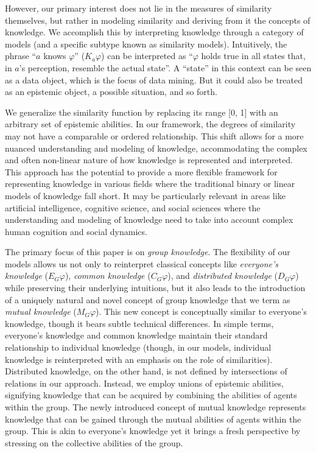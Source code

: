 \documentclass{article}
\renewcommand{\phi}{\varphi}
\begin{document}
However, our primary interest does not lie in the measures of similarity themselves, but rather in modeling similarity and deriving from it the concepts of knowledge. We accomplish this by interpreting knowledge through a category of models (and a specific subtype known as similarity models). Intuitively, the phrase ``$a$ knows $\phi$'' ($K_a\phi$) can be interpreted as ``$\phi$ holds true in all states that, in $a$'s perception, resemble the actual state''. A ``state'' in this context can be seen as a data object, which is the focus of data mining. But it could also be treated as an epistemic object, a possible situation, and so forth.

We generalize the similarity function by replacing its range [0, 1] with an arbitrary set of epistemic abilities. In our framework, the degrees of similarity may not have a comparable or ordered relationship. This shift allows for a more nuanced understanding and modeling of knowledge, accommodating the complex and often non-linear nature of how knowledge is represented and interpreted. This approach has the potential to provide a more flexible framework for representing knowledge in various fields where the traditional binary or linear models of knowledge fall short. It may be particularly relevant in areas like artificial intelligence, cognitive science, and social sciences where the understanding and modeling of knowledge need to take into account complex human cognition and social dynamics.

The primary focus of this paper is on \emph{group knowledge}. The flexibility of our models allows us not only to reinterpret classical concepts like \emph{everyone's knowledge} ($E_G\phi$), \emph{common knowledge} ($C_G\phi$), and \emph{distributed knowledge} ($D_G\phi$) while preserving their underlying intuitions, but it also leads to the introduction of a uniquely natural and novel concept of group knowledge that we term as \emph{mutual knowledge} ($M_G\phi$). This new concept is conceptually similar to everyone's knowledge, though it bears subtle technical differences. In simple terms, everyone's knowledge and common knowledge maintain their standard relationship to individual knowledge (though, in our models, individual knowledge is reinterpreted with an emphasis on the role of similarities). Distributed knowledge, on the other hand, is not defined by intersections of relations in our approach. Instead, we employ unions of epistemic abilities, signifying knowledge that can be acquired by combining the abilities of agents within the group. The newly introduced concept of mutual knowledge represents knowledge that can be gained through the mutual abilities of agents within the group. This is akin to everyone's knowledge yet it brings a fresh perspective by stressing on the collective abilities of the group.
\end{document}
